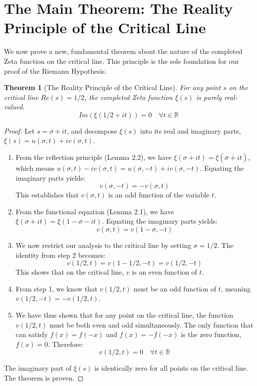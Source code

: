 \documentclass{article}
\newtheorem{theorem}{Theorem}[section]
\begin{document}
\section{The Main Theorem: The Reality Principle of the Critical Line}
We now prove a new, fundamental theorem about the nature of the completed Zeta function on the critical line. This principle is the sole foundation for our proof of the Riemann Hypothesis.

\begin{theorem}[The Reality Principle of the Critical Line]
For any point $s$ on the critical line $Re(s)=1/2$, the completed Zeta function $\xi(s)$ is purely real-valued.
$$Im(\xi(1/2 + it)) = 0 \quad \forall t \in \mathbb{R}$$
\end{theorem}

\begin{proof}
Let $s = \sigma + it$, and decompose $\xi(s)$ into its real and imaginary parts, $\xi(s) = u(\sigma, t) + i v(\sigma, t)$.
\begin{enumerate}
    \item From the reflection principle (Lemma 2.2), we have $\overline{\xi(\sigma + it)} = \xi(\overline{\sigma + it})$, which means $u(\sigma, t) - i v(\sigma, t) = u(\sigma, -t) + i v(\sigma, -t)$. Equating the imaginary parts yields:
    $$v(\sigma, -t) = -v(\sigma, t)$$
    This establishes that $v(\sigma, t)$ is an odd function of the variable $t$.

    \item From the functional equation (Lemma 2.1), we have $\xi(\sigma + it) = \xi(1-\sigma - it)$. Equating the imaginary parts yields:
    $$v(\sigma, t) = v(1-\sigma, -t)$$

    \item We now restrict our analysis to the critical line by setting $\sigma = 1/2$. The identity from step 2 becomes:
    $$v(1/2, t) = v(1-1/2, -t) = v(1/2, -t)$$
    This shows that on the critical line, $v$ is an even function of $t$.

    \item From step 1, we know that $v(1/2, t)$ must be an odd function of $t$, meaning $v(1/2, -t) = -v(1/2, t)$.
    
    \item We have thus shown that for any point on the critical line, the function $v(1/2, t)$ must be both even and odd simultaneously. The only function that can satisfy $f(x) = f(-x)$ and $f(x) = -f(-x)$ is the zero function, $f(x)=0$. Therefore:
    $$v(1/2, t) = 0 \quad \forall t \in \mathbb{R}$$
\end{enumerate}
The imaginary part of $\xi(s)$ is identically zero for all points on the critical line. The theorem is proven.
\end{proof}
\end{document}
